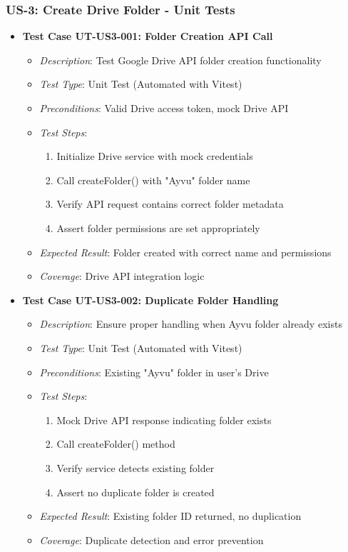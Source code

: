 \documentclass[12pt]{article}
\begin{document}
\subsubsection{US-3: Create Drive Folder - Unit Tests}
\begin{itemize}
  \item \textbf{Test Case UT-US3-001: Folder Creation API Call}
    \begin{itemize}
      \item \textit{Description}: Test Google Drive API folder creation functionality
      \item \textit{Test Type}: Unit Test (Automated with Vitest)
      \item \textit{Preconditions}: Valid Drive access token, mock Drive API
      \item \textit{Test Steps}:
        \begin{enumerate}
          \item Initialize Drive service with mock credentials
          \item Call createFolder() with "Ayvu" folder name
          \item Verify API request contains correct folder metadata
          \item Assert folder permissions are set appropriately
        \end{enumerate}
      \item \textit{Expected Result}: Folder created with correct name and permissions
      \item \textit{Coverage}: Drive API integration logic
    \end{itemize}

  \item \textbf{Test Case UT-US3-002: Duplicate Folder Handling}
    \begin{itemize}
      \item \textit{Description}: Ensure proper handling when Ayvu folder already exists
      \item \textit{Test Type}: Unit Test (Automated with Vitest)
      \item \textit{Preconditions}: Existing "Ayvu" folder in user's Drive
      \item \textit{Test Steps}:
        \begin{enumerate}
          \item Mock Drive API response indicating folder exists
          \item Call createFolder() method
          \item Verify service detects existing folder
          \item Assert no duplicate folder is created
        \end{enumerate}
      \item \textit{Expected Result}: Existing folder ID returned, no duplication
      \item \textit{Coverage}: Duplicate detection and error prevention
    \end{itemize}
\end{itemize}
\end{document}
